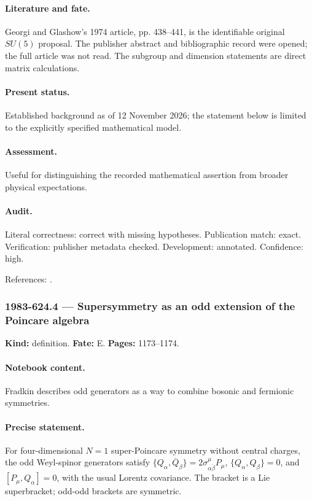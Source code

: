 \paragraph{Literature and fate.} Georgi and Glashow’s 1974 article, pp. 438–441, is the identifiable original \(SU(5)\) proposal. The publisher abstract and bibliographic record were opened; the full article was not read. The subgroup and dimension statements are direct matrix calculations.

\paragraph{Present status.} Established background as of 12 November 2026; the statement below is limited to the explicitly specified mathematical model.

\paragraph{Assessment.} Useful for distinguishing the recorded mathematical assertion from broader physical expectations.

\paragraph{Audit.} Literal correctness: correct with missing hypotheses. Publication match: exact. Verification: publisher metadata checked. Development: annotated. Confidence: high.

\noindent References: \citep{georgiglashow1974unity}.\par

\subsubsection{1983-624.4 --- Supersymmetry as an odd extension of the Poincare algebra}

\label{item:1983-624.4}

\noindent\textbf{Kind:} definition. \textbf{Fate:} E. \textbf{Pages:} 1173--1174.\par

\paragraph{Notebook content.} Fradkin describes odd generators as a way to combine bosonic and fermionic symmetries.

\paragraph{Precise statement.} For four-dimensional \(N=1\) super-Poincare symmetry without central charges, the odd Weyl-spinor generators satisfy \(\{Q_\alpha,\overline Q_{\dot\beta}\}=2\sigma^\mu_{\alpha\dot\beta}P_\mu\), \(\{Q_\alpha,Q_\beta\}=0\), and \([P_\mu,Q_\alpha]=0\), with the usual Lorentz covariance. The bracket is a Lie superbracket; odd-odd brackets are symmetric.

